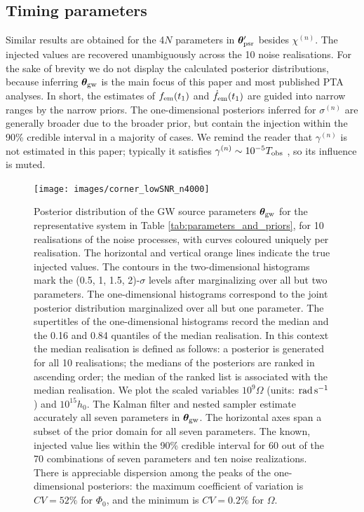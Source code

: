 \documentclass[fleqn,usenatbib,useAMS]{mnras}
\begin{document}
\subsection{Timing parameters} \label{sec:timing_parameters}
Similar results are obtained for the 4$N$ parameters in $\boldsymbol{\theta}_{\rm psr}'$ besides $\chi^{(n)}$. The injected values are recovered unambiguously across the 10 noise realisations. For the sake of brevity we do not display the calculated posterior distributions, because inferring $\boldsymbol{\theta}_{\rm gw}$ is the main focus of this paper and most published PTA analyses. In short, the estimates of $f_{\rm em}(t_1)$ and $\dot{f}_{\rm em}(t_1)$ are guided into narrow ranges by the narrow priors. The one-dimensional posteriors inferred for $\sigma^{(n)}$ are generally broader due to the broader prior, but contain the injection within the  90\% credible interval in a majority of cases. We remind the reader that $\gamma^{(n)}$ is not estimated in this paper; typically it satisfies $\gamma^{(n)} \sim 10^{-5} T_{\rm obs}$ \citep{Price2012,Myers2021MNRAS.502.3113M,Meyers2021,Vargas}, so its influence is muted. \newline 



  

\begin{figure}
	\texttt{[image: images/corner\_lowSNR\_n4000]}
	\caption[Caption of LOF]{Posterior distribution of the GW source parameters $\boldsymbol{\theta}_{\rm gw}$ for the representative system in Table \ref{tab:parameters_and_priors}, for 10 realisations of the noise processes, with curves coloured uniquely per realisation. The horizontal and vertical orange lines indicate the true injected values. The contours in the two-dimensional histograms mark the (0.5, 1, 1.5, 2)-$\sigma$ levels after marginalizing over all but two parameters. The one-dimensional histograms correspond to the joint posterior distribution marginalized over all but one parameter. The supertitles of the one-dimensional histograms record the median and the 0.16 and 0.84 quantiles of the median realisation. In this context the median realisation is defined as follows: a posterior is generated for all 10 realisations; the medians of the posteriors are ranked in ascending order; the median of the ranked list is associated with the median realisation. We plot the scaled variables $10^9 \Omega$ (units: ${\rm rad \, s^{-1}}$) and $10^{15} h_0$. The Kalman filter and nested sampler estimate accurately all seven parameters in ${\boldsymbol{\theta}}_{\rm gw}$. The horizontal axes span a subset of the prior domain for all seven parameters. The known, injected value lies within the 90\% credible interval for 60 out of the 70 combinations of seven parameters and ten noise realizations. There is appreciable dispersion among the peaks of the one-dimensional posteriors: the maximum coefficient of variation is $CV = 52 \%$ for $\Phi_0$, and the minimum is $CV = 0.2 \%$ for $\Omega$.}
	\label{fig:corner_plot_1}
\end{figure}
\end{document}
